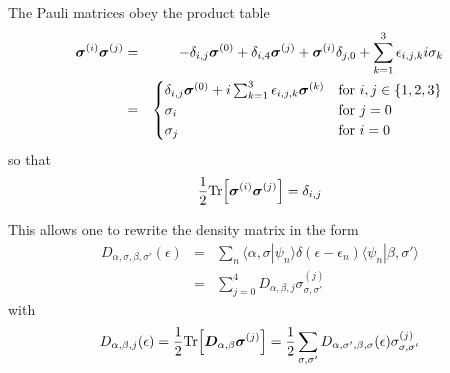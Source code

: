 \documentclass[11pt,a4paper]{report}
\begin{document}
The Pauli matrices obey the product table
\begin{eqnarray}
\bm{\sigma}^{(i)}\bm{\sigma}^{(j)}&=&
-\delta_{i,j}\bm{\sigma}^{(0)}
+\delta_{i,4}\bm{\sigma}^{(j)}
+\bm{\sigma}^{(i)}\delta_{j,0}
+\sum_{k=1}^3 \epsilon_{i,j,k}i\sigma_k
\nonumber\\
&=&
\begin{cases}
\delta_{i,j}\bm{\sigma}^{(0)}+i\sum_{k=1}^3\epsilon_{i,j,k}\bm{\sigma}^{(k)}
&\text{for $i,j\in\{1,2,3\}$}\\
\sigma_i &\text{for $j=0$}\\
\sigma_j &\text{for $i=0$}
\end{cases}
\end{eqnarray}
so that
\begin{eqnarray}
\frac{1}{2}\mathrm{Tr}\Bigl[\bm{\sigma}^{(i)}\bm{\sigma}^{(j)}\Bigr]=\delta_{i,j}
\end{eqnarray}


This allows one to rewrite the density matrix in the form
\begin{eqnarray}
D_{\alpha,\sigma,\beta,\sigma'}(\epsilon)
&=&\sum_n \langle\alpha,\sigma|\psi_n\rangle \delta(\epsilon-\epsilon_n)
\langle\psi_n|\beta,\sigma'\rangle
\nonumber\\
&=&\sum_{j=0}^4 D_{\alpha,\beta,j}\sigma_{\sigma,\sigma'}^{(j)}
\end{eqnarray}
with
\begin{eqnarray}
D_{\alpha,\beta,j}(\epsilon)
=\frac{1}{2}\mathrm{Tr}\Bigl[\bm{D}_{\alpha,\beta}\bm{\sigma}^{(j)}\Bigr]
=\frac{1}{2}\sum_{\sigma,\sigma'}D_{\alpha,\sigma',\beta,\sigma}(\epsilon)
\sigma_{\sigma,\sigma'}^{(j)}
\end{eqnarray}
\end{document}
